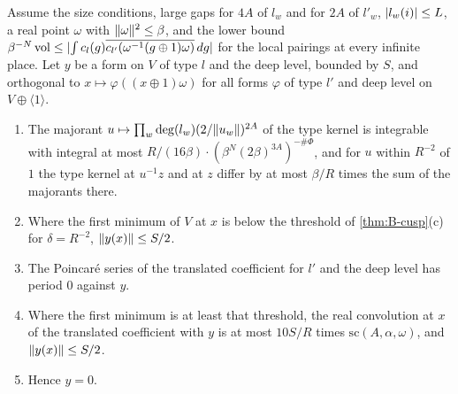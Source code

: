 \begin{lemma}[Halving]\label{lem:deep-halving}
Assume the size conditions, large gaps for $4A$ of $l_w$ and for $2A$ of $l'_w$, $\lvert l_w(i)\rvert\le L$, a real point $\omega$ with $\lVert \omega\rVert^2\le\beta$, and the lower bound $\beta^{-N}\operatorname{vol}\le\lvert \int c_{l}(g)\overline{c_{l'}(\omega^{-1}(g\oplus1)\omega)}\,dg\rvert$ for the
local pairings at every infinite place. Let $y$ be a form on $V$ of type $l$ and the deep level, bounded by $S$, and orthogonal to $x\mapsto\varphi((x\oplus1)\omega)$ for all forms $\varphi$ of type $l'$ and deep level on
$V\oplus\langle1\rangle$.
\begin{enumerate}[label=\textup{(\alph*)}]
\item The majorant $u\mapsto\prod_w\deg(l_w)(2/\lVert u_w\rVert)^{2A}$ of the type kernel is integrable with integral at most $R/(16\beta)\cdot(\beta^N(2\beta)^{3A})^{-\#\Phi}$, and for $u$ within $R^{-2}$ of $1$ the type kernel at $u^{-1}z$ and at $z$ differ by
at most $\beta/R$ times the sum of the majorants there.
\item Where the first minimum of $V$ at $x$ is below the threshold of \cref{thm:B-cusp}(c) for $\delta=R^{-2}$, $\lVert y(x)\rVert\le S/2$.
\item The Poincar\'e series of the translated coefficient for $l'$ and the deep level has period $0$ against $y$.
\item Where the first minimum is at least that threshold, the real convolution at $x$ of the translated coefficient with $y$ is at most $10S/R$ times $\mathrm{sc}(A,\alpha,\omega)$, and $\lVert y(x)\rVert\le S/2$.
\item Hence $y=0$.
\end{enumerate}
\end{lemma}

